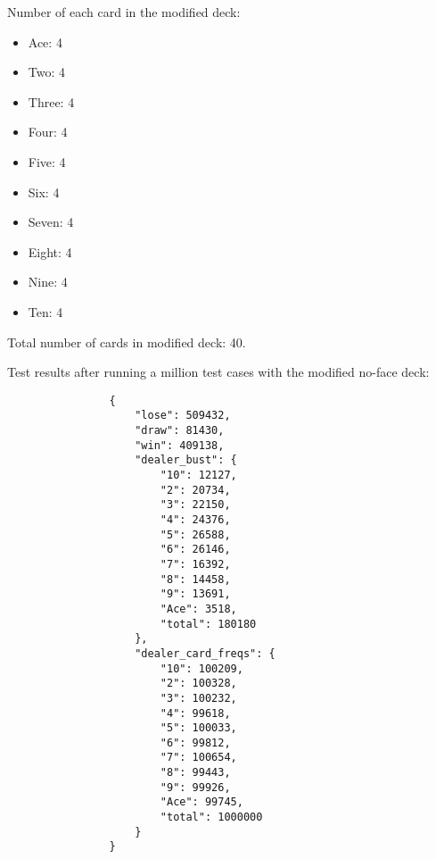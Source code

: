 \documentclass{article}
\begin{document}
        \hspace{-0.5cm}Number of each card in the modified deck:
        \begin{itemize}
            \item Ace: 4
            \item Two: 4
            \item Three: 4
            \item Four: 4
            \item Five: 4
            \item Six: 4
            \item Seven: 4
            \item Eight: 4
            \item Nine: 4
            \item Ten: 4
        \end{itemize}

        \vspace{0.25cm}

        \hspace{-0.5cm}Total number of cards in modified deck: 40.

        \hspace{-0.5cm}Test results after running a million test cases with the modified no-face deck:

        \begin{verbatim}
                {
                    "lose": 509432,
                    "draw": 81430,
                    "win": 409138,
                    "dealer_bust": {
                        "10": 12127,
                        "2": 20734,
                        "3": 22150,
                        "4": 24376,
                        "5": 26588,
                        "6": 26146,
                        "7": 16392,
                        "8": 14458,
                        "9": 13691,
                        "Ace": 3518,
                        "total": 180180
                    },
                    "dealer_card_freqs": {
                        "10": 100209,
                        "2": 100328,
                        "3": 100232,
                        "4": 99618,
                        "5": 100033,
                        "6": 99812,
                        "7": 100654,
                        "8": 99443,
                        "9": 99926,
                        "Ace": 99745,
                        "total": 1000000
                    }
                }
        \end{verbatim}
\end{document}
